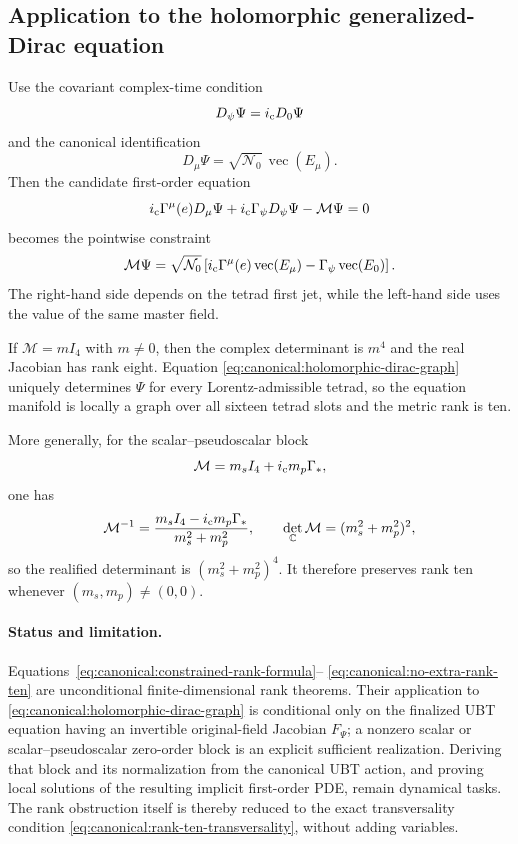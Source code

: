 \subsection{Application to the holomorphic generalized-Dirac equation}
Use the covariant complex-time condition
\begin{equation}
 D_\psi\Psi=i_{\rm c}D_0\Psi
\end{equation}
and the canonical identification
\begin{equation}
 D_\mu\Psi
 =\sqrt{\mathcal N_0}\,\operatorname{vec}(E_\mu).
\end{equation}
Then the candidate first-order equation
\begin{equation}
 i_{\rm c}\Gamma^\mu(e)D_\mu\Psi
 +i_{\rm c}\Gamma_\psi D_\psi\Psi
 -\mathcal M\Psi=0
\end{equation}
becomes the pointwise constraint
\begin{equation}
 \mathcal M\Psi
 =\sqrt{\mathcal N_0}\left[
 i_{\rm c}\Gamma^\mu(e)\operatorname{vec}(E_\mu)
 -\Gamma_\psi\operatorname{vec}(E_0)
 \right].
 \label{eq:canonical:holomorphic-dirac-graph}
\end{equation}
The right-hand side depends on the tetrad first jet, while the left-hand side
uses the value of the same master field.

If $\mathcal M=mI_4$ with $m\neq0$, then the complex determinant is $m^4$ and
the real Jacobian has rank eight.  Equation
\eqref{eq:canonical:holomorphic-dirac-graph} uniquely determines $\Psi$ for
every Lorentz-admissible tetrad, so the equation manifold is locally a graph
over all sixteen tetrad slots and the metric rank is ten.

More generally, for the scalar--pseudoscalar block
\begin{equation}
 \mathcal M=m_sI_4+i_{\rm c}m_p\Gamma_*,
\end{equation}
one has
\begin{equation}
 \mathcal M^{-1}
 =\frac{m_sI_4-i_{\rm c}m_p\Gamma_*}{m_s^2+m_p^2},
 \qquad
 \det_{\mathbb C}\mathcal M=(m_s^2+m_p^2)^2,
\end{equation}
so the realified determinant is $(m_s^2+m_p^2)^4$.  It therefore preserves
rank ten whenever $(m_s,m_p)\neq(0,0)$.

\paragraph{Status and limitation.}
Equations~\eqref{eq:canonical:constrained-rank-formula}--
\eqref{eq:canonical:no-extra-rank-ten} are unconditional finite-dimensional
rank theorems.  Their application to
\eqref{eq:canonical:holomorphic-dirac-graph} is conditional only on the
finalized UBT equation having an invertible original-field Jacobian
$F_\Psi$; a nonzero scalar or scalar--pseudoscalar zero-order block is an
explicit sufficient realization.  Deriving that block and its normalization
from the canonical UBT action, and proving local solutions of the resulting
implicit first-order PDE, remain dynamical tasks.  The rank obstruction itself
is thereby reduced to the exact transversality condition
\eqref{eq:canonical:rank-ten-transversality}, without adding variables.

